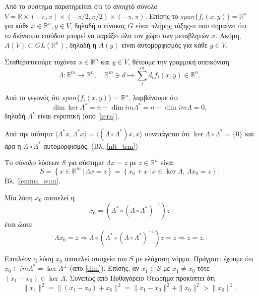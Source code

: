 Από το σύστημα παρατηρείται ότι το ανοιχτό σύνολο $V = \mathbb{R} \times (-\pi, 
\pi) \times (-\pi/2, \pi/2) \times (-\pi, \pi)$. Επίσης το $span\{f_{i}(x,y)\} = 
\mathbb{R}^{n}$ για κάθε $x\in \mathbb{R}^n, y \in V$, δηλαδή ο πίνακας $G$ 
είναι πλήρης τάξης-$n$ που σημαίνει ότι το διάνυσμα εισόδου μπορεί να παράξει 
όλο τον χώρο των μεταβλητών $x$. Ακόμη, $A(V)\subset GL(\mathbb{R}^n)$, 
δηλαδή η $A(y)$ είναι αυτομορφισμός για κάθε $y\in V$.


Σταθεροποιούμε τυχόντα $x \in \mathbb{R}^n$ και $y\in V$, θέτουμε την 
γραμμική απεικόνιση 
\begin{equation*}
    \Lambda:\mathbb{R}^{m} \rightarrow \mathbb{R}^{n}, \quad \mathbb{R}^m \ni 
    d \mapsto \sum_{i}^{m}{d_{i}f_{i}}(x, y) \in \mathbb{R}^{n}.
\end{equation*}

Από το γεγονός ότι $span\{f_{i}(x,y)\} = \mathbb{R}^{n}$, λαμβάνουμε ότι
\begin{equation*}
    \dim{\ker{\Lambda^{\ast}}} = n - \dim{im{\Lambda^{\ast}}} = n - \dim{im
    {\Lambda}} = 0,
\end{equation*}
δηλαδή $\Lambda^{\ast}$ είναι ενριπτική (απο \ref{kern}). 

Από την ισότητα $\langle \Lambda^{\ast}x, \Lambda^{\ast}x \rangle = \langle 
(\Lambda \circ \Lambda^{\ast}) x, x\rangle$ συνεπάγεται ότι $\ker \Lambda 
\circ \Lambda^{\ast} = \{0\}$ και άρα η $\Lambda \circ \Lambda^{\ast}$ 
αυτομορφισμός. (Βλ. \ref{nlt_trm})

Το σύνολο λύσεων $S$ για σύστημα $\Lambda x = z$ με $z \in \mathbb{R}^n$ είναι 
\begin{equation*}
    S = \left\{x\in \mathbb{R}^m \, | \, \Lambda x = z\right\} = \left\{x_{0} + 
        x \, | \, x \in \ker{\Lambda},\, \Lambda x_{0} = z \right\}. 
\end{equation*}Βλ. \ref{lemma_sum}.

Μία λύση $x_0$ αποτελεί η 
\begin{equation*}
    x_0 = \left(\Lambda^{\ast} \circ \left(\Lambda \circ \Lambda^{\ast} \right)^
        {-1} \right)z
\end{equation*}
έτσι ώστε
\begin{equation*}
    \Lambda x_0 = z \Rightarrow \Lambda \circ \left(\Lambda^{\ast} \circ \left
    (\Lambda \circ \Lambda^{\ast} \right)^{-1} \right)z = z \Rightarrow z = z.
\end{equation*}

Επιπλέον η λύση $x_0$ αποτελεί στοιχείο του $S$ με ελάχιστη νόρμα. Πράγματι 
έχουμε ότι $x_0 \in im\Lambda^{\ast} = \ker{\Lambda}^{\perp}$ (απο \ref{dim}). 
Επίσης, αν $x_1 \in S$ με $x_1 \neq x_0$ τότε $\left(x_1 - x_0\right) \in 
\ker{\Lambda}$. Συνεπώς από Πυθαγόρειο Θεώρημα προκύπτει ότι 
\begin{equation*}
    \|x_1\|^2 = \|(x_1 - x_0) + x_0\|^2 = \|x_1 - x_0\|^2 + \|x_0\|^2 > \|x_0\|
    ^2.
\end{equation*}
 
